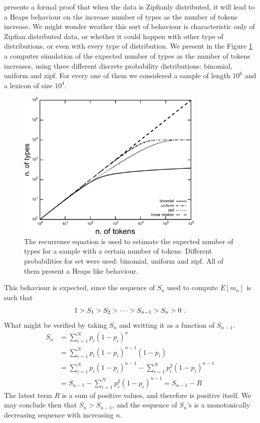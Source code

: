 \cite{vanLeijenhorst} presents a formal proof that when the data is Zipfianly distributed,
it will lead to a Heaps behaviour on the increase number of types as the number of tokens
increase. We might wonder weather this sort of behaviour is characteristic only of Zipfian
distributed data, or whether it could happen with other type of distributions, or even with
every type of distribution. We present in the Figure \ref{fig:heapslaw_rdist} 
a computer simulation of the
expected number of types as the number of tokens increases, using three different discrete
probability distributions: binomial, uniform and zipf. For every one of them we considered
a sample of length $10^6$ and a lexicon of size $10^4$.

\begin{figure}[htbp]
\centering
\includegraphics[width=0.8\textwidth]{images/heapslaw_rdist.pdf}
\caption{The recurrence equation is used to estimate the expected number of types for a sample with a certain number of tokens. Different probabilities for set were used: binomial, uniform and zipf. All of them present a Heaps like behaviour.}
\label{fig:heapslaw_rdist}
\end{figure}

This behaviour is expected, since the sequence of $S_n$ used to compute $E[m_n]$ is such that
\begin{equation}
1 > S_1 > S_2 > \cdots > S_{n-1} > S_n > 0\textmd{ .}
\end{equation}
What might be verified by taking $S_n$ and writting it as a function of $S_{n-1}$.
\begin{align}
\label{eq:SnR}
S_n &= \sum_{i=1}^N p_i (1-p_i)^n \nonumber \\
    &= \sum_{i=1}^N p_i (1-p_i)^{n-1} (1 - p_i) \nonumber \\
    &= \sum_{i=1}^N p_i (1-p_i)^{n-1} - \sum_{i=1}^N p_i^2 (1-p_i)^{n-1} \nonumber \\
    &= S_{n-1} - \sum_{i=1}^N p_i^2 (1-p_i)^{n-1} = S_{n-1} - R
\end{align}
The latest term $R$ is a sum of positive values, and therefore is positive itself.
We may conclude then that $S_n > S_{n-1}$, and the sequence of $S_n$'s is a monotonically
decreasing sequence with increasing $n$.

